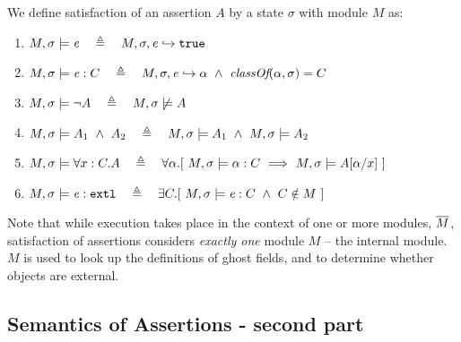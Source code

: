 \begin{definition} 
\label{def:chainmail-semantics}
We define satisfaction of an assertion $A$ by a %
state $\sigma$ with 
 module $M$ as:
\begin{enumerate}
\item
\label{cExpr}
$\satisfiesA{M}{\sigma}{{\re}}\ \ \ \triangleq \ \ \   \eval{M}{\sigma}{{\re}}{\true}$
\item
\label{cClass}
$M , \sigma \models {{\mathit{e}}} : C\ \ \ \triangleq \ \ \   M, \sigma, {\mathit{e}} \hookrightarrow \alpha\   \wedge \ \textit{classOf}(\alpha, \sigma)= C$
\item
$\satisfiesA{M}{\sigma}{\neg A}\ \ \ \triangleq \ \ \   {M},{\sigma}\not\models{A}$
\item
$\satisfiesA{M}{\sigma}{A_1\ \wedge\ A_2}\ \ \ \triangleq \ \ \   \satisfiesA{M}{\sigma}{A_1} \   \wedge \ \satisfiesA{M}{\sigma}{A_2}$
\item
\label{quant1}
$\satisfiesA{M}{\sigma}{\all{x:C}{A}} \ \ \ \triangleq \ \ \   
\forall \alpha.[\   \satisfiesA {M}{\sigma} {\alpha:C}  \ \Longrightarrow   \ \satisfiesA{M}{\sigma} {A[\alpha/x]} \ ] $

\item
\label{cExternal}
$\satisfiesA{M}{\sigma}{\external{{\re}}} \ \ \ \triangleq \ \ \  \exists C.[\ \satisfiesA{M}{\sigma}{{{\re}} : C} \ \wedge \ C \notin M \ ]$
\end{enumerate}
\end{definition}

 
Note that while execution takes place in the context of one or more modules, $\overline{M}$, satisfaction of assertions considers \emph{exactly one} module  $M$ -- the internal module. 
{$M$} is used  to look up the definitions of ghost fields, and to %
 determine whether objects are  external.

\subsection{Semantics of Assertions - second part}  

